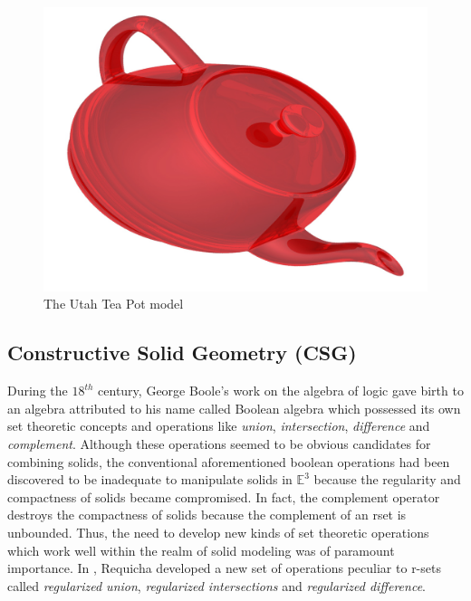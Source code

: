 \begin{figure}[htbp]
\centering
\includegraphics[trim=0.0cm 0.3cm 0.3cm 0.3cm, clip=true, totalheight=0.5\textheight]{Pictures/Teapot.png}
\caption[The Utah Tea Pot model]{The Utah Tea Pot model}
\label{Teapot}
\end{figure}
 
\subsection{Constructive Solid Geometry (CSG)}

\hspace{30} During   the   $18^{th}$   century,   George   Boole's   work   on   the   algebra   of   logic   gave  
birth   to   an   algebra   attributed   to   his   name   called   Boolean   algebra   which  
possessed   its   own   set   theoretic   concepts   and   operations   like   \textit{union},  
\textit{intersection}, \textit{difference} and \textit{complement}.   Although   these   operations  
seemed   to   be   obvious   candidates   for   combining   solids,   the   conventional  
aforementioned   boolean   operations   had   been   discovered   to   be   inadequate   to  
manipulate   solids   in   $\mathbb{E}^3$ because   the   regularity  
and   compactness   of   solids   became   compromised.   In   fact,   the   complement  
operator   destroys   the   compactness   of   solids   because   the   complement   of   an  
r­set   is   unbounded.   Thus,   the   need   to   develop   new   kinds   of   set   theoretic  
operations   which   work   well   within   the   realm   of   solid   modeling   was   of   paramount  
importance.   In   \cite{23},   Requicha   developed   a   new   set   of   operations   peculiar   to  
r­-sets   called   \textit{regularized   union},   \textit{regularized   intersections}   and   \textit{regularized  
difference}.

